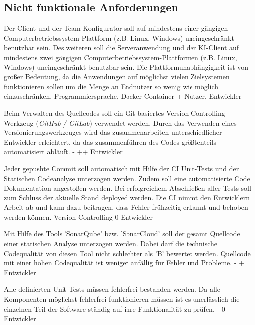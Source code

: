 \subsection{Nicht funktionale Anforderungen}

        {Der Client und der Team-Konfigurator soll auf mindestens einer gängigen Computerbetriebssystem-Plattform (z.B. Linux, Windows) uneingeschränkt benutzbar sein. Des weiteren soll die Serveranwendung und der KI-Client auf mindestens zwei gängigen Computerbetriebssystem-Plattformen (z.B. Linux, Windows) uneingeschränkt benutzbar sein.}
        {Die Plattformunabhängigkeit ist von großer Bedeutung, da die Anwendungen auf möglichst vielen Zielsystemen funktionieren sollen um die Menge an Endnutzer so wenig wie möglich einzuschränken.}
        {Programmiersprache, Docker-Container}
        {+}
        {Nutzer, Entwickler}

        {Beim Verwalten des Quellcodes soll ein Git basiertes Version-Controlling Werkzeug (\textit{GitHub / GitLab}) verwendet werden.}
        {Durch das Verwenden eines Versionierungswerkzeuges wird das zusammenarbeiten unterschiedlicher Entwickler erleichtert, da das zusammenführen des Codes größtenteils automatisiert abläuft.}
        {-}
        {++}
        {Entwickler}

        {Jeder gepushte Commit soll automatisch mit Hilfe der CI Unit-Tests und der Statischen Codeanalyse unterzogen werden. Zudem soll eine automatisierte Code Dokumentation angestoßen werden. Bei erfolgreichem Abschließen aller Tests soll zum Schluss der aktuelle Stand deployed werden.}
        {Die CI nimmt den Entwicklern Arbeit ab und kann dazu beitragen, dass Fehler frühzeitig erkannt und behoben werden können.}
        {Version-Controlling}
        {0}
        {Entwickler}

        {Mit Hilfe des Tools 'SonarQube' bzw. 'SonarCloud' soll der gesamt Quellcode einer statischen Analyse unterzogen werden. Dabei darf die technische Codequalität von diesen Tool nicht schlechter als 'B' bewertet werden.}
        {Quellcode mit einer hohen Codequalität ist weniger anfällig für Fehler und Probleme.}
        {-}
        {+}
        {Entwickler}

        {Alle definierten Unit-Tests müssen fehlerfrei bestanden werden.}
        {Da alle Komponenten möglichst fehlerfrei funktionieren müssen ist es unerlässlich die einzelnen Teil der Software ständig auf ihre Funktionalität zu prüfen.}
        {-}
        {0}
        {Entwickler}

